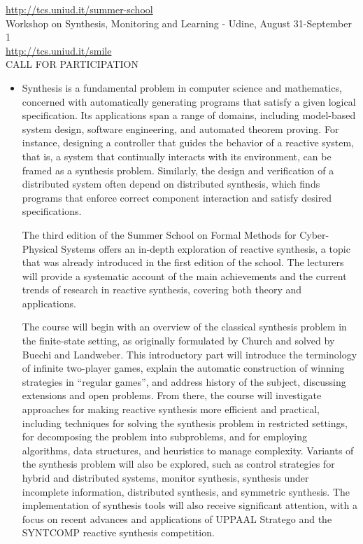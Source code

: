\documentclass[prodmode,acmtecs]{acmsmall} %
\begin{document}
  \href{http://tcs.uniud.it/summer-school}{http://tcs.uniud.it/summer-school} \\ 
  Workshop on Synthesis, Monitoring and Learning - Udine, August 31-September 1\\ 
  \href{http://tcs.uniud.it/smile}{http://tcs.uniud.it/smile}\\ 
CALL FOR PARTICIPATION 

\begin{itemize}\item   Synthesis is a fundamental problem in computer science and mathematics, concerned with automatically generating programs that satisfy a given logical specification. Its applications span a range of domains, including model-based system design, software engineering, and automated theorem proving. For instance, designing a controller that guides the behavior of a reactive system, that is, a system that continually interacts with its environment, can be framed as a synthesis problem. Similarly, the design and verification of a distributed system often depend on distributed synthesis, which finds programs that enforce correct component interaction and satisfy desired specifications. 
 
  The third edition of the Summer School on Formal Methods for Cyber-Physical Systems offers an in-depth exploration of reactive synthesis, a topic that was already introduced in the first edition of the school. The lecturers will provide a systematic account of the main achievements and the current trends of research in reactive synthesis, covering both theory and applications. 
 
  The course will begin with an overview of the classical synthesis problem in the finite-state setting, as originally formulated by Church and solved by Buechi and Landweber. This introductory part will introduce the terminology of infinite two-player games, explain the automatic construction of winning strategies in “regular games”, and address history of the subject, discussing extensions and open problems. From there, the course will investigate approaches for making reactive synthesis more efficient and practical, including techniques for solving the synthesis problem in restricted settings, for decomposing the problem into subproblems, and for employing algorithms, data structures, and heuristics to manage complexity. Variants of the synthesis problem will also be explored, such as control strategies for hybrid and distributed systems, monitor synthesis, synthesis under incomplete information, distributed synthesis, and symmetric synthesis. The implementation of synthesis tools will also receive significant attention, with a focus on recent advances and applications of UPPAAL Stratego and the SYNTCOMP reactive synthesis competition. 
 

\end{itemize}
\end{document}
